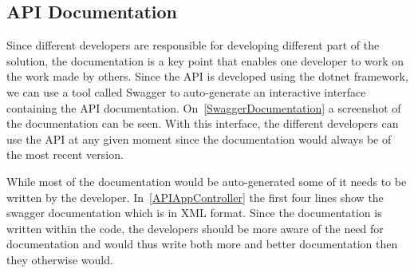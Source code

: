 \subsection{API Documentation}
Since different developers are responsible for developing different part of the solution, the documentation is a key point that enables one developer to work on the work made by others.
Since the API is developed using the dotnet framework, we can use a tool called Swagger to auto-generate an interactive interface containing the API documentation\cite{SwaggerIO}.
On~\autoref{SwaggerDocumentation} a screenshot of the documentation can be seen.
With this interface, the different developers can use the API at any given moment since the documentation would always be of the most recent version.


While most of the documentation would be auto-generated some of it needs to be written by the developer.
In~\autoref{APIAppController} the first four lines show the swagger documentation which is in XML format.
Since the documentation is written within the code, the developers should be more aware of the need for documentation and would thus write both more and better documentation then they otherwise would.
